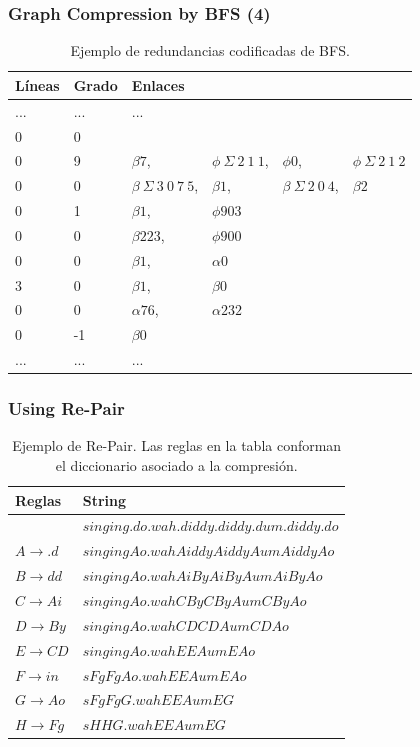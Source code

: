 \begin{frame}
\frametitle{Graph Compression by BFS (4)}

 \begin{table}%
\caption{Ejemplo de redundancias codificadas de BFS.}
\centering
\scriptsize

\begin{tabular}{|l|l|llll|}
	\toprule
	Líneas & Grado & \multicolumn{3}{l}{Enlaces} &  \\
	\midrule
	... & ... & ... & & &  \\
	0 & 0 & & & & \\
	0 & 9 & $\beta7$, & $\phi\:\Sigma\:2\:1\:1$, & $\phi0$, & $\phi\:\Sigma\:2\:1\:2$ \\
	0 & 0 & $\beta\:\Sigma\:3\:0\:7\:5$, & $\beta1$, & $\beta\:\Sigma\:2\:0\:4$, & $\beta2$ \\
	0 & 1 & $\beta1$, & $\phi903$ & & \\
	0 & 0 & $\beta223$, & $\phi900$ & & \\
	0 & 0 & $\beta1$, & $\alpha0$ & & \\
	3 & 0 & $\beta1$, & $\beta0$ & & \\
	0 & 0 & $\alpha76$, & $\alpha232$ & & \\
	0 & -1 & $\beta0$ & & & \\
	... & ... & ... & & &  \\
\end{tabular}
\end{table} 

\end{frame}


\begin{frame}
\frametitle{Using Re-Pair}

 \begin{table}%
\caption{Ejemplo de Re-Pair. Las reglas en la tabla conforman el diccionario asociado a la compresión.}
\label{table:repair}
\centering
\footnotesize

\begin{tabular}{|l|l|}
	\toprule
	Reglas & String \\
	\midrule
	 & $singing.do.wah.diddy.diddy.dum.diddy.do$ \\
	$A \rightarrow .d$ & $singingAo.wahAiddyAiddyAumAiddyAo$ \\
	$B \rightarrow dd$ & $singingAo.wahAiByAiByAumAiByAo$ \\
	$C \rightarrow Ai$ & $singingAo.wahCByCByAumCByAo$ \\
	$D \rightarrow By$ & $singingAo.wahCDCDAumCDAo$ \\
	$E \rightarrow CD$ & $singingAo.wahEEAumEAo$ \\
	$F \rightarrow in$ & $sFgFgAo.wahEEAumEAo$ \\
	$G \rightarrow Ao$ & $sFgFgG.wahEEAumEG$ \\
	$H \rightarrow Fg$ & $sHHG.wahEEAumEG$ \\
	\bottomrule
\end{tabular}
\end{table} 

\end{frame}

